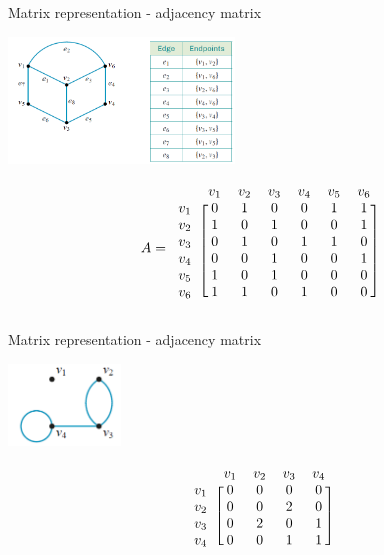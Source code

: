 \documentclass[
	11pt, %
]{beamer}
\begin{document}
\begin{frame}{Matrix representation - adjacency matrix}
    \begin{center}
        \includegraphics[width = 6cm]{Graph1.png}\\
    \end{center}
    \[
        A = 
        \begin{blockarray}{ccccccc}
            & v_1 & v_2 & v_3 & v_4 & v_5 & v_6 &\\
            \begin{block}{c[cccccc]}
                v_1 & 0 & 1 & 0 & 0 & 1 & 1\\
                v_2 & 1 & 0 & 1 & 0 & 0 & 1\\
                v_3 & 0 & 1 & 0 & 1 & 1 & 0\\
                v_4 & 0 & 0 & 1 & 0 & 0 & 1\\
                v_5 & 1 & 0 & 1 & 0 & 0 & 0\\
                v_6 & 1 & 1 & 0 & 1 & 0 & 0\\ 
            \end{block}
        \end{blockarray}
    \]
\end{frame}

\begin{frame}{Matrix representation - adjacency matrix}
    \begin{center}
        \includegraphics[width = 3cm]{Graph2.png}\\
    \end{center}
    \[
        \begin{blockarray}{ccccc}
            & v_1 & v_2 & v_3 & v_4\\
            \begin{block}{c[cccc]}
                v_1 & 0 & 0 & 0 & 0\\
                v_2 & 0 & 0 & 2 & 0\\
                v_3 & 0 & 2 & 0 & 1\\
                v_4 & 0 & 0 & 1 & 1\\
            \end{block}
        \end{blockarray}
    \]
\end{frame}
\end{document}
